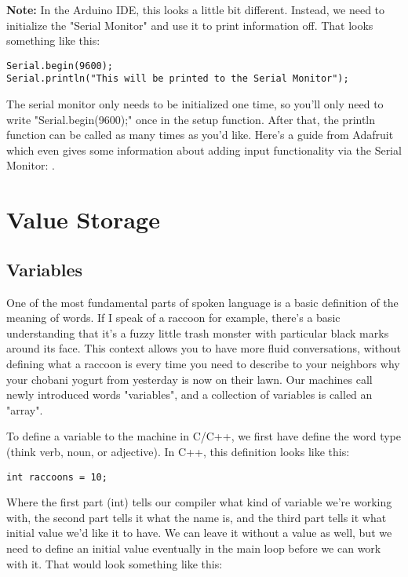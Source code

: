 \documentclass[a4paper]{article}
\begin{document}
\textbf{Note:} In the Arduino IDE, this looks a little bit different. Instead, we need to initialize the "Serial Monitor" and use it to print information off. That looks something like this:

\begin{verbatim}
Serial.begin(9600);
Serial.println("This will be printed to the Serial Monitor");
\end{verbatim}

The serial monitor only needs to be initialized one time, so you'll only need to write "Serial.begin(9600);" once in the setup function. After that, the println function can be called as many times as you'd like. Here's a guide from Adafruit which even gives some information about adding input functionality via the Serial Monitor: \cite{serial}.

\section{Value Storage}
\subsection{Variables}
\label{variables}
One of the most fundamental parts of spoken language is a basic definition of the meaning of words. If I speak of a raccoon for example, there's a basic understanding that it's a fuzzy little trash monster with particular black marks around its face. This context allows you to have more fluid conversations, without defining what a raccoon is every time you need to describe to your neighbors why your chobani yogurt from yesterday is now on their lawn. Our machines call newly introduced words "variables", and a collection of variables is called an "array".

To define a variable to the machine in C/C++, we first have define the word type (think verb, noun, or adjective). In C++, this definition looks like this:

\begin{verbatim}
int raccoons = 10;
\end{verbatim}

Where the first part (int) tells our compiler what kind of variable we're working with, the second part tells it what the name is, and the third part tells it what initial value we'd like it to have. We can leave it without a value as well, but we need to define an initial value eventually in the main loop before we can work with it. That would look something like this:
\end{document}
